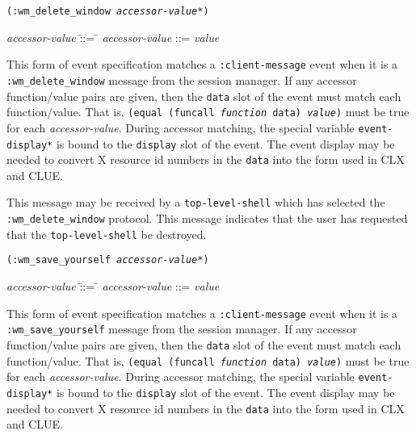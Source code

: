 \documentclass[twoside]{book}
\begin{document}
\begin{sloppy}
\pagebreak
{\samepage
{}
{\tt (:wm\_delete\_window {\em accessor-value}*)}\\
\hspace*{.75in}
\parbox[t]{5.75in}{
\begin{tabbing}
{\em accessor-value} \= ::= \= \kill
{\em accessor-value} \>::=  {\em value} \\
\end{tabbing}}
}
\begin{flushright}
\parbox[t]{5.75in}{
This
form of event specification matches a {\tt :client-message}
event when it is a {\tt :wm\_delete\_window} message from the session manager.
If
any accessor function/value pairs are
given, then the {\tt data} slot of the event must
match each function/value. That is, {\tt (equal (funcall {\em function}
data) {\em value})} must be true for each {\em accessor-value}.
During accessor matching, the special variable {\tt *event-display*} is
bound to the {\tt display} slot of the event. The event display may be
needed to convert X resource id numbers in the {\tt data} into the form
used in CLX and CLUE.}

\parbox[t]{5.75in}{
This message may be received by a {\tt top-level-shell} which has selected the 
{\tt :wm\_delete\_window} protocol. This message indicates that the user has
requested that the {\tt top-level-shell} be destroyed.}
\end{flushright}

{\samepage
{}
{\tt (:wm\_save\_yourself {\em accessor-value}*)}\\
\hspace*{.75in}
\parbox[t]{5.75in}{
\begin{tabbing}
{\em accessor-value} \= ::= \= \kill
{\em accessor-value} \>::=  {\em value} \\
\end{tabbing}}
}
\begin{flushright}
\parbox[t]{5.75in}{
This
form of event specification matches a {\tt :client-message}
event when it is a {\tt :wm\_save\_yourself} message from the session manager.
If
any accessor function/value pairs are
given, then the {\tt data} slot of the event must
match each function/value. That is, {\tt (equal (funcall {\em function}
data) {\em value})} must be true for each {\em accessor-value}.
During accessor matching, the special variable {\tt *event-display*} is
bound to the {\tt display} slot of the event. The event display may be
needed to convert X resource id numbers in the {\tt data} into the form
used in CLX and CLUE.}


\end{flushright}
\end{sloppy}
\end{document}
